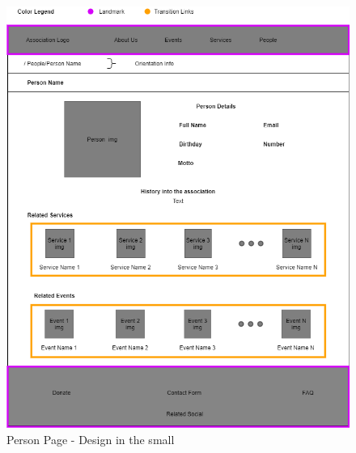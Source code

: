 \begin{figure}[h!]
		\centering
		\begin{minipage}[b]{1\textwidth}
    			\includegraphics[width=\textwidth]{./assets/persondetails.png}
			\caption{Person Page - Design in the small}
		\end{minipage}
\end{figure}
\FloatBarrier
